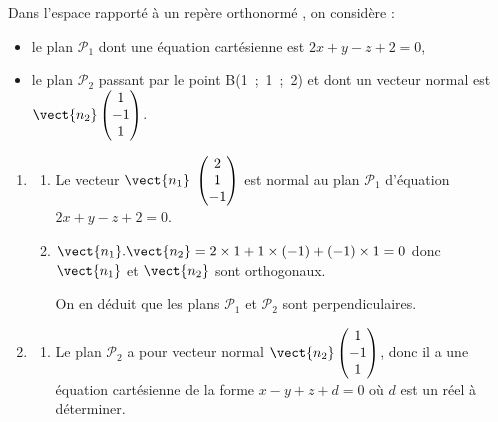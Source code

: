 
\medskip

Dans l'espace rapporté à un repère orthonormé \Oijk, on considère :

\begin{itemize}
\item[$\bullet~~$]le plan $\mathcal{P}_1$ dont une équation cartésienne est $2x + y - z +2 = 0$,
\item[$\bullet~~$]le plan $\mathcal{P}_2$ passant par le point B(1~;~1~;~2) et dont un vecteur normal est $\vect{n_2}\begin{pmatrix}1\\-1\\1\end{pmatrix}$.
\end{itemize}


\begin{enumerate}
\item 
	\begin{enumerate}
		\item  Le vecteur $\vect{n_1}\;\begin{pmatrix} 2 \\1 \\ -1\end{pmatrix}$ est normal au plan $\mathcal{P}_1$ d'équation $2x+y-z+2=0$.
		
		\item %
		

$\vect{n_1}.\vect{n_2} = 2\times 1 + 1\times (-1) +(-1)\times 1 = 0$ donc $\vect{n_1}$ et $\vect{n_2}$ sont orthogonaux. 

On en déduit que les plans $\mathcal{P}_1$ et $\mathcal{P}_2$ sont perpendiculaires. 
	\end{enumerate}
\item 
	\begin{enumerate}
		\item %
Le plan $\mathcal{P}_2$ a pour vecteur normal $\vect{n_2}\begin{pmatrix}1\\-1\\1\end{pmatrix}$, donc il a une équation cartésienne de la forme $x-y+z+d=0$ où $d$ est un réel à déterminer.


\end{enumerate}
\end{enumerate}
